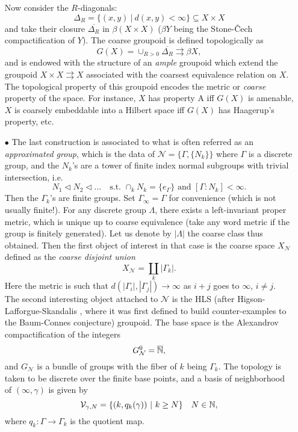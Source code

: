 \begin{itemize}
Now consider the $R$-diagonals:
\[\Delta_R = \{(x,y) \ | \ d(x,y) < \infty\}\subseteq X\times X\]
and take their closure $\overline{\Delta_R }$ in $\beta (X\times X) $ ($\beta Y$ being the Stone-\v{C}ech compactification of $Y$). The coarse groupoid is defined topologically as 
\[G(X) = \cup_{R>0} \overline{\Delta_R} \rightrightarrows \beta X ,\]
and is endowed with the structure of an \textit{ample} groupoid which extend the groupoid $X\times X \rightrightarrows X$ associated with the coarsest equivalence relation on $X$. The topological property of this groupoid encodes the metric or \textit{coarse} property of the space. For instance, $X$ has property A iff $G(X)$ is amenable, $X$ is coarsely embeddable into a Hilbert space iff $G(X)$ has Haagerup's property, etc.\\
\item[$\bullet$] The last construction is associated to what is often referred as an \textit{approximated group}, which is the data of $\mathcal N = \{ \Gamma , \{N_k\}\}$ where $\Gamma$ is a discrete group, and the $N_k$'s are a tower of finite index normal subgroups with trivial intersection, i.e. 
\[N_1 \triangleleft N_2 \triangleleft ... \quad \text{s.t. } \cap_k N_k = \{ e_\Gamma\} \text{ and } [\Gamma	: N_k] < \infty.  \]
Then the $\Gamma_k$'s are finite groups. Set $\Gamma_\infty = \Gamma$ for convenience (which is not usually finite!). For any discrete group $\Lambda$, there exists a left-invariant proper metric, which is unique up to coarse equivalence (take any word metric if the group is finitely generated). Let us denote by $|\Lambda |$ the coarse class thus obtained. Then the first object of interest in that case is the coarse space $X_\mathcal{N}$ defined as the \textit{coarse disjoint union}
\[X_\mathcal{N} = \coprod_k |\Gamma_k |.\]
Here the metric is such that $d(| \Gamma_i| , |\Gamma_j| )\rightarrow \infty $ as $i+j$ goes to $\infty$, $i\neq j$.\\

The second interesting object attached to $\mathcal{N}$ is the HLS (after Higson-Lafforgue-Skandalis \cite{HLS}, where it was first defined to build counter-examples to the Baum-Connes conjecture) groupoid. The base space is the Alexandrov compactification  of the integers 
\[G_\mathcal{N}^0 = \overline{\mathbb N},\]
and $G_\mathcal{N}$ is a bundle of groups with the fiber of $k$ being $\Gamma_k$. The topology is taken to be discrete over the finite base points, and a basis of neighborhood of $(\infty,\gamma)$ is given by 
\[\mathcal{V}_{\gamma, N} = \{(k, q_k(\gamma)) \ | \ k\geq N \} \quad N\in\mathbb N ,\]
where $q_k : \Gamma \rightarrow \Gamma_k$ is the quotient map.\\
 \end{itemize}

